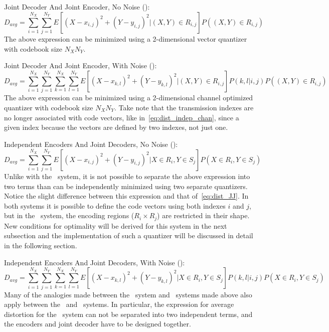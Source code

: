 {\sc \noindent Joint Decoder And Joint Encoder, No Noise (\sysJJ):}
\begin{equation}
  \label{eq:dist_JJ}
    D_{avg} = \sum_{i=1}^{N_X}\sum_{j=1}^{N_Y} E[{(X-x_{i,j})}^2 + {(Y-y_{i,j})}^2 | (X,Y) \in R_{i,j}]P((X,Y) \in R_{i,j})
\end{equation}
The above expression can be minimized using a 2-dimensional vector quantizer with codebook size $N_XN_Y$.

{\sc \noindent Joint Decoder And Joint Encoder, With Noise (\sysJJN):}
\begin{equation}
    D_{avg} = \sum_{i=1}^{N_X}\sum_{j=1}^{N_Y}\sum_{k=1}^{N_X}\sum_{l=1}^{N_Y} E[{(X-x_{k,l})}^2 +
    {(Y-y_{k,l})}^2 | (X,Y) \in R_{i,j}]P(k,l|i,j)P((X,Y) \in R_{i,j})
\end{equation}
The above expression can be minimized using a 2-dimensional channel optimized quantizer with codebook size $N_XN_Y$. Take note that the transmission indexes are no longer associated with code vectors, like in~\ref{eq:dist_indep_chan}, since a given index because the vectors are defined by two indexes, not just one.


{\sc \noindent Independent Encoders And Joint Decoders, No Noise (\sysIJ):}
\begin{equation}
    \label{eq:dist_IJ}
    D_{avg} = \sum_{i=1}^{N_X}\sum_{j=1}^{N_Y} E[{(X-x_{i,j})}^2 + {(Y-y_{i,j})}^2 | X \in R_i, Y \in S_j]P(X \in R_i, Y \in S_j)
\end{equation}
Unlike with the \sysII\ system, it is not possible to separate the above expression into two terms than can be independently minimized using two separate quantizers. Notice the slight difference between this expression and that of~\ref{eq:dist_JJ}. In both systems it is possible to define the code vectors using both indexes $i$ and $j$, but in the \sysIJ\ system, the encoding regions ($R_i \times R_j$) are restricted in their shape. New conditions for optimality will be derived for this system in the next subsection and the implementation of such a quantizer will be discussed in detail in the following section. 

{\sc \noindent Independent Encoders And Joint Decoders, With Noise (\sysIJN):}
\begin{equation}
    \label{eq:dist_IJN}
    D_{avg} = \sum_{i=1}^{N_X}\sum_{j=1}^{N_Y}\sum_{k=1}^{N_X}\sum_{l=1}^{N_Y} E[{(X-x_{k,l})}^2 +
    {(Y-y_{k,l})}^2 | X \in R_i, Y \in S_j]P(k,l|i,j)P(X \in R_i, Y \in S_j)
\end{equation}
Many of the analogies made between the \sysIJ\ system and \sysJJ\ systems made above also apply between the \sysIJN\ and \sysIJ\ systems. In particular, the expression for average distortion for the \sysIJN\ system can not be separated into two independent terms, and the encoders and joint decoder have to be designed together.


